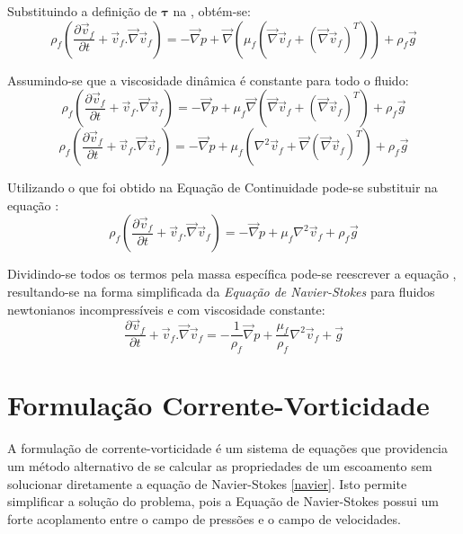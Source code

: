 Substituindo a definição de $\boldsymbol{\tau}$ na , obtém-se:
\begin{equation}
    \rho_f \left(
    	\dfrac{\partial \vec{v}_f}{\partial t} + 
    	\vec{v}_f.\vec{\nabla}\vec{v}_f
	\right) =
    -\vec{\nabla}p +
    \vec{\nabla}\left(\mu_f\left(\vec{\nabla}\vec{v}_f + \left(\vec{\nabla}\vec{v}_f \right)^T \right)\right) +
    \rho_f \vec{g}
\end{equation}

Assumindo-se que a viscosidade dinâmica é constante para todo o fluido:
\begin{equation}
    \rho_f \left(
    	\dfrac{\partial \vec{v}_f}{\partial t} + 
    	\vec{v}_f.\vec{\nabla}\vec{v}_f
	\right) =
    -\vec{\nabla}p +
    \mu_f \vec{\nabla}\left(\vec{\nabla}\vec{v}_f + \left(\vec{\nabla}\vec{v}_f \right)^T \right) +
    \rho_f \vec{g}
\end{equation}
\begin{equation}
    \rho_f \left(
    	\dfrac{\partial \vec{v}_f}{\partial t} + 
    	\vec{v}_f.\vec{\nabla}\vec{v}_f
	\right) =
    -\vec{\nabla}p +
    \mu_f \left(\nabla^2\vec{v}_f + \vec{\nabla}\left(\vec{\nabla}\vec{v}_f \right)^T \right) +
    \rho_f \vec{g}
    \label{tau_last}
\end{equation}

Utilizando o que foi obtido na Equação de Continuidade  pode-se substituir na equação :
\begin{equation}
    \rho_f \left(
    	\dfrac{\partial \vec{v}_f}{\partial t} + 
    	\vec{v}_f.\vec{\nabla}\vec{v}_f
	\right) =
    -\vec{\nabla}p +
    \mu_f \nabla^2\vec{v}_f +
    \rho_f \vec{g}
    \label{tau_simple}
\end{equation}

Dividindo-se todos os termos pela massa específica pode-se reescrever a equação , resultando-se na forma simplificada da \textit{Equação de Navier-Stokes} para fluidos newtonianos incompressíveis e com viscosidade constante:
\begin{equation}
	\dfrac{\partial \vec{v}_f}{\partial t} + 
	\vec{v}_f.\vec{\nabla}\vec{v}_f =
    -\dfrac{1}{\rho_f} \vec{\nabla}p +
    \dfrac{\mu_f}{\rho_f} \nabla^2\vec{v}_f +
    \vec{g}
    \label{navier}
\end{equation}

\section{\textbf{Formulação Corrente-Vorticidade}}
\label{sec_corr_vort}
A formulação de corrente-vorticidade é um sistema de equações que providencia um método alternativo de se calcular as propriedades de um escoamento sem solucionar diretamente a equação de Navier-Stokes \eqref{navier}.
Isto permite simplificar a solução do problema, pois a Equação de Navier-Stokes possui um forte acoplamento entre o campo de pressões e o campo de velocidades.

